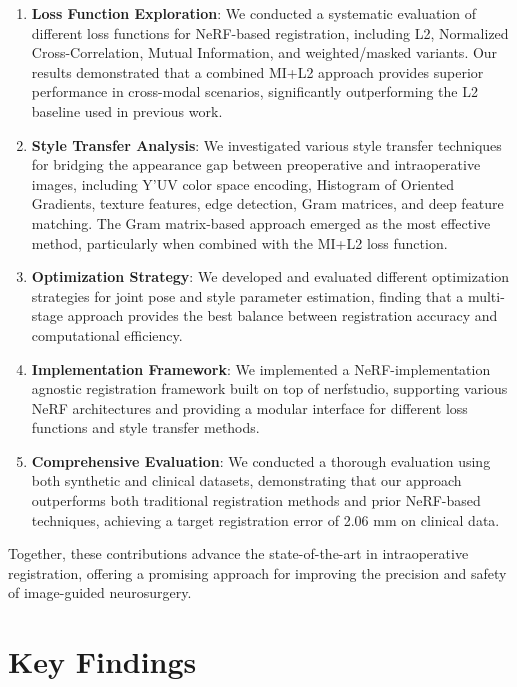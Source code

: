 \begin{enumerate}
    \item \textbf{Loss Function Exploration}: We conducted a systematic evaluation of different loss functions for NeRF-based registration, including L2, Normalized Cross-Correlation, Mutual Information, and weighted/masked variants. Our results demonstrated that a combined MI+L2 approach provides superior performance in cross-modal scenarios, significantly outperforming the L2 baseline used in previous work.
    
    \item \textbf{Style Transfer Analysis}: We investigated various style transfer techniques for bridging the appearance gap between preoperative and intraoperative images, including Y'UV color space encoding, Histogram of Oriented Gradients, texture features, edge detection, Gram matrices, and deep feature matching. The Gram matrix-based approach emerged as the most effective method, particularly when combined with the MI+L2 loss function.
    
    \item \textbf{Optimization Strategy}: We developed and evaluated different optimization strategies for joint pose and style parameter estimation, finding that a multi-stage approach provides the best balance between registration accuracy and computational efficiency.
    
    \item \textbf{Implementation Framework}: We implemented a NeRF-implementation agnostic registration framework built on top of nerfstudio, supporting various NeRF architectures and providing a modular interface for different loss functions and style transfer methods.
    
    \item \textbf{Comprehensive Evaluation}: We conducted a thorough evaluation using both synthetic and clinical datasets, demonstrating that our approach outperforms both traditional registration methods and prior NeRF-based techniques, achieving a target registration error of 2.06 mm on clinical data.
\end{enumerate}

Together, these contributions advance the state-of-the-art in intraoperative registration, offering a promising approach for improving the precision and safety of image-guided neurosurgery.

\section{Key Findings}

